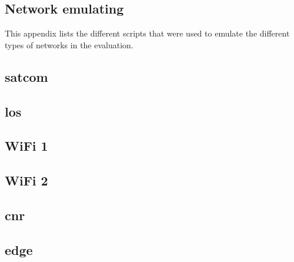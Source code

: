 \begin{appendices}


\chapter{Network emulating}

\label{appendix-netem-scripts}

This appendix lists the different scripts that were used to emulate the
different types of networks in the evaluation.

\section{\gls{satcom}}


\section{\gls{los}}


\section{WiFi 1}


\section{WiFi 2}


\section{\gls{cnr}}


\section{\gls{edge}}





\end{appendices}
